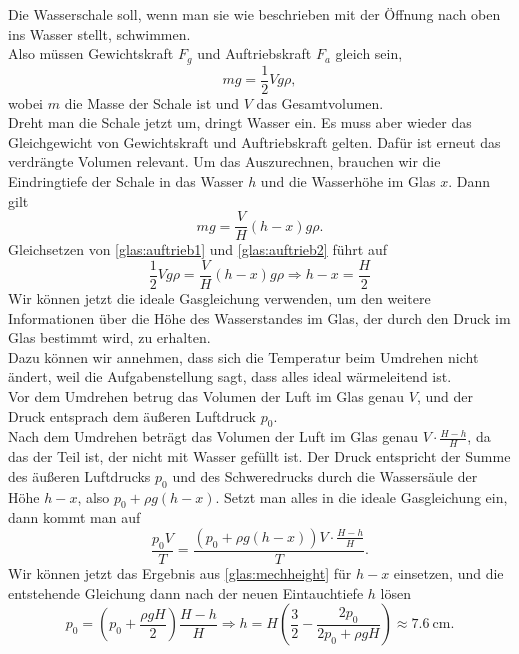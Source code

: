 \begin{Answer}
	Die Wasserschale soll, wenn man sie wie beschrieben mit der Öffnung nach oben ins Wasser stellt, schwimmen.\\
	Also müssen Gewichtskraft $F_g$ und Auftriebskraft $F_a$ gleich sein,
	\begin{equation}\label{glas:auftrieb1}
		m g = \frac{1}{2}Vg\rho,
	\end{equation}
	wobei $m$ die Masse der Schale ist und $V$ das Gesamtvolumen.\\
	Dreht man die Schale jetzt um, dringt Wasser ein. Es muss aber wieder das Gleichgewicht von Gewichtskraft und Auftriebskraft gelten. Dafür ist erneut das verdrängte Volumen relevant. Um das Auszurechnen, brauchen wir die Eindringtiefe der Schale in das Wasser $h$ und die Wasserhöhe im Glas $x$. Dann gilt
	\begin{equation}\label{glas:auftrieb2}
		mg = \frac{V}{H}\left(h-x\right) g \rho.
	\end{equation}
	Gleichsetzen von \eqref{glas:auftrieb1} und \eqref{glas:auftrieb2} führt auf
	\begin{equation}\label{glas:mechheight}
		\frac{1}{2}Vg\rho = \frac{V}{H}\left(h-x\right) g \rho \Rightarrow h-x = \frac{H}{2}
	\end{equation}
	Wir können jetzt die ideale Gasgleichung verwenden, um den weitere Informationen über die Höhe des Wasserstandes im Glas, der durch den Druck im Glas bestimmt wird, zu erhalten.\\
	Dazu können wir annehmen, dass sich die Temperatur beim Umdrehen nicht ändert, weil die Aufgabenstellung sagt, dass alles ideal wärmeleitend ist.\\
	Vor dem Umdrehen betrug das Volumen der  Luft im Glas genau $V$, und der Druck entsprach dem äußeren Luftdruck $p_0$.\\
	Nach dem Umdrehen beträgt das Volumen der Luft im Glas genau $V \cdot \frac{H-h}{H}$, da das der Teil ist, der nicht mit Wasser gefüllt ist. Der Druck entspricht der Summe des äußeren Luftdrucks $p_0$ und des Schweredrucks durch die Wassersäule der Höhe $h-x$, also $p_0 + \rho g \left(h-x\right)$. Setzt man alles in die ideale Gasgleichung ein, dann kommt man auf
	\begin{equation}
		\frac{p_0 V}{T} = \frac{\left(p_0 + \rho g \left(h-x\right) \right) V \cdot \frac{H-h}{H}}{T}.
	\end{equation}
	Wir können jetzt das Ergebnis aus \eqref{glas:mechheight} für $h-x$ einsetzen, und die entstehende Gleichung dann nach der neuen Eintauchtiefe $h$ lösen
	\begin{equation}\boxed{
		p_0= \left(p_0 + \frac{\rho g H}{2}\right) \frac{H-h}{H} \Rightarrow h = H \left(\frac{3}{2} - \frac{2p_0}{2p_0 + \rho g H}\right) \approx 7.6~\mathrm{cm}.}
	\end{equation}
\end{Answer}